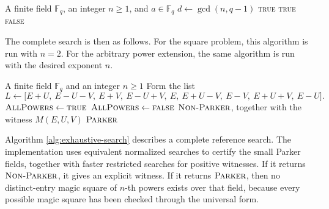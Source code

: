 \documentclass{article}
\newcommand{\F}{\mathbb F}
\theoremstyle{definition}
\numberwithin{equation}{section}
\begin{document}
\begin{algorithm}[H]
\caption{Testing whether an element is an \(n\)-th power}
\label{alg:nth-power-test}
\begin{algorithmic}[1]
\Require A finite field \(\F_q\), an integer \(n\geq 1\), and \(a\in\F_q\)
\State \(d\gets \gcd(n,q-1)\)
    \State \Return \textsc{true}
\EndIf
{}
    \State \Return \textsc{true}
\Else
    \State \Return \textsc{false}
\EndIf
\end{algorithmic}
\end{algorithm}

The complete search is then as follows. For the square problem, this algorithm is run with \(n=2\).  For the arbitrary
power extension, the same algorithm is run with the desired exponent \(n\).

\begin{algorithm}[H]
\caption{Exhaustive search for a magic square of \(n\)-th powers over \(\mathbb F_q\)}
\label{alg:exhaustive-search}
\begin{algorithmic}[1]
\Require A finite field \(\mathbb F_q\) and an integer \(n\geq 1\)
            \State Form the list
            \[
            L\gets
            \bigl[
            E+U,\ E-U-V,\ E+V,\ E-U+V,\ E,\ E+U-V,\ E-V,\ E+U+V,\ E-U
            \bigr].
            \]
                \State \(\textsc{AllPowers}\gets \textsc{true}\)
                        \State \(\textsc{AllPowers}\gets \textsc{false}\)
                    \EndIf
                \EndFor
                    \State \Return \(\textsc{Non-Parker}\), together with the witness \(M(E,U,V)\)
                \EndIf
            \EndIf
        \EndFor
    \EndFor
\EndFor
\State \Return \(\textsc{Parker}\)
\end{algorithmic}
\end{algorithm}

Algorithm \ref{alg:exhaustive-search} describes a complete reference search.
The implementation uses equivalent normalized searches to certify the small
Parker fields, together with faster restricted searches for positive witnesses. If it returns \(\textsc{Non-Parker}\), it gives an
explicit witness. If it returns \(\textsc{Parker}\), then no distinct-entry magic
square of \(n\)-th powers exists over that field, because every possible magic
square has been checked through the universal form.
\end{document}
